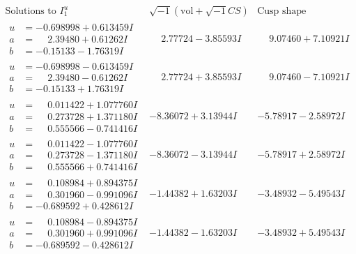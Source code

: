 \documentclass[1p]{elsarticle_modified}
\theoremstyle{definition}
\newcommand{\I}{\sqrt{-1}}
\begin{document}
$$\begin{array}{c|c|c}  
\text{Solutions to }I^u_{1}& \I (\text{vol} + \sqrt{-1}CS) & \text{Cusp shape}\\
 \hline 
\begin{aligned}
u &= -0.698998 + 0.613459 I \\
a &= \phantom{-}2.39480 + 0.61262 I \\
b &= -0.15133 - 1.76319 I\end{aligned}
 & \phantom{-}2.77724 - 3.85593 I & \phantom{-}9.07460 + 7.10921 I \\ \hline\begin{aligned}
u &= -0.698998 - 0.613459 I \\
a &= \phantom{-}2.39480 - 0.61262 I \\
b &= -0.15133 + 1.76319 I\end{aligned}
 & \phantom{-}2.77724 + 3.85593 I & \phantom{-}9.07460 - 7.10921 I \\ \hline\begin{aligned}
u &= \phantom{-}0.011422 + 1.077760 I \\
a &= \phantom{-}0.273728 + 1.371180 I \\
b &= \phantom{-}0.555566 - 0.741416 I\end{aligned}
 & -8.36072 + 3.13944 I & -5.78917 - 2.58972 I \\ \hline\begin{aligned}
u &= \phantom{-}0.011422 - 1.077760 I \\
a &= \phantom{-}0.273728 - 1.371180 I \\
b &= \phantom{-}0.555566 + 0.741416 I\end{aligned}
 & -8.36072 - 3.13944 I & -5.78917 + 2.58972 I \\ \hline\begin{aligned}
u &= \phantom{-}0.108984 + 0.894375 I \\
a &= \phantom{-}0.301960 - 0.991096 I \\
b &= -0.689592 + 0.428612 I\end{aligned}
 & -1.44382 + 1.63203 I & -3.48932 - 5.49543 I \\ \hline\begin{aligned}
u &= \phantom{-}0.108984 - 0.894375 I \\
a &= \phantom{-}0.301960 + 0.991096 I \\
b &= -0.689592 - 0.428612 I\end{aligned}
 & -1.44382 - 1.63203 I & -3.48932 + 5.49543 I \\ \hline\begin{aligned}

\end{aligned}
\end{array}$$
\end{document}
